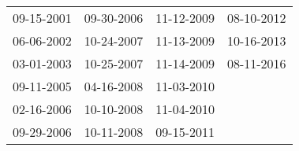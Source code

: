 \begin{supertabular}{llll}
 09-15-2001 &  09-30-2006 &  11-12-2009 &  08-10-2012 \\
 06-06-2002 &  10-24-2007 &  11-13-2009 &  10-16-2013 \\
 03-01-2003 &  10-25-2007 &  11-14-2009 &  08-11-2016 \\
 09-11-2005 &  04-16-2008 &  11-03-2010 &             \\
 02-16-2006 &  10-10-2008 &  11-04-2010 &             \\
 09-29-2006 &  10-11-2008 &  09-15-2011 &             \\
\end{supertabular}
